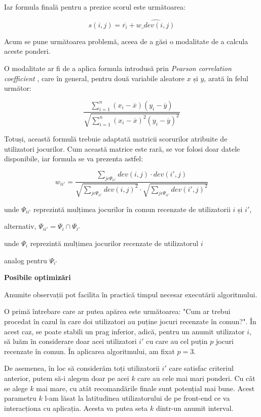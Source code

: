 \documentclass[12pt,a4paper]{report}
\begin{document}
\bigskip

Iar formula finală pentru a prezice scorul este următoarea:

\[  s(i,j) = \overline{r_i} + \hat{w\_dev(i,j)}  \]

Acum se pune următoarea problemă, aceea de a găsi o modalitate de a calcula aceste ponderi.

O modalitate ar fi de a aplica formula introdusă prin \emph{Pearson correlation coefficient} \cite{30}
, care în general, pentru două variabile aleatore \( x \) și \( y \), arată în felul următor: 

\[ \frac{{}\sum_{i=1}^{n} (x_i - \overline{x})(y_i - \overline{y})}
{\sqrt{\sum_{i=1}^{n} (x_i - \overline{x})^2(y_i - \overline{y})^2}} \]

Totuși, această formulă trebuie adaptată matricii scorurilor atribuite de utilizatori jocurilor. Cum această matrice este rară, se vor folosi doar datele disponibile, iar formula se va prezenta astfel:

\[ w_{ii'} = \dfrac{ \sum\limits_{j \epsilon \Psi_{ii'} } dev(i, j) \cdot dev(i', j) }{
\sqrt{\sum\limits_{j \epsilon \Psi_{ii'} } dev(i, j)^2} \cdot \sqrt{\sum\limits_{j \epsilon \Psi_{ii'} } dev(i', j)^2} }\]

unde \( \Psi_{ii'}\) reprezintă mulțimea jocurilor în comun recenzate de utilizatorii \( i \) și \( i' \),

alternativ,
\( \Psi_{ii'} = \Psi_{i} \cap \Psi_{i'}  \)

unde \( \Psi_{i} \) reprezintă mulțimea jocurilor recenzate de utilizatorul \( i \)

analog pentru \( \Psi_{i'} \)

\bigskip
\textbf{Posibile optimizări}
\bigskip

Anumite observații pot facilita în practică timpul necesar executării algoritmului.

O primă întrebare care ar putea apărea este următoarea: "Cum ar trebui procedat în cazul în care doi utilizatori au puține jocuri recenzate în comun?". În acest caz, se poate stabili un prag inferior, adică, pentru un anumit utilizator \( i \), să luăm în considerare doar acei utilizatori \( i' \) cu care au cel puțin \( p \) jocuri recenzate în comun. În aplicarea algoritmului, am fixat \( p = 3 \).

De asemenea, în loc să considerăm toți utilizatorii \( i' \) care satisfac criteriul anterior, putem să-i alegem doar pe acei \( k \) care au cele mai mari ponderi. Cu cât se alege \( k \) mai mare, cu atât recomandările finale sunt potențial mai bune. Acest parametru \( k \) l-am lăsat la latitudinea utilizatorului de pe front-end ce va interacționa cu aplicația. Acesta va putea seta \( k \) dintr-un anumit interval.
\end{document}
